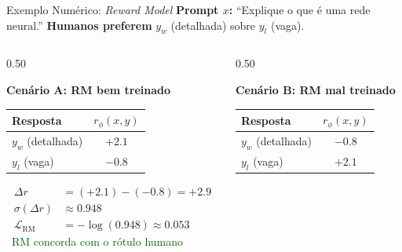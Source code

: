 \documentclass[aspectratio=169, xcolor=dvipsnames]{beamer}
\begin{document}
  \begin{frame}{Exemplo Numérico: \textit{Reward Model}}
    \textbf{Prompt $x$:} ``Explique o que é uma rede neural.'' \quad
    \textbf{Humanos preferem} $y_w$ (detalhada) sobre $y_l$ (vaga).

    \vspace{0.4em}
    \begin{columns}[T]
      \begin{column}{0.50\textwidth}
        \begin{block}{\textbf{Cenário A: RM bem treinado}}
          \small
          \begin{tabular}{lc}
            \toprule
            \textbf{Resposta} & $r_\phi(x,y)$ \\
            \midrule
            $y_w$ (detalhada) & $+2.1$ \\
            $y_l$ (vaga)      & $-0.8$ \\
            \bottomrule
          \end{tabular}

          \vspace{0.3em}
          \begin{align*}
            \Delta r &= (+2.1) - (-0.8) = \mathbf{+2.9} \\[1pt]
            \sigma(\Delta r) &\approx 0.948 \\[1pt]
            \mathcal{L}_{\text{RM}} &= -\log(0.948) \approx \mathbf{0.053}
          \end{align*}
          \centering \textcolor{DarkGreen}{\checkmark\ RM concorda com o rótulo humano}
        \end{block}
      \end{column}
      \begin{column}{0.50\textwidth}
        \begin{block}{\textbf{Cenário B: RM mal treinado}}
          \small
          \begin{tabular}{lc}
            \toprule
            \textbf{Resposta} & $r_\phi(x,y)$ \\
            \midrule
            $y_w$ (detalhada) & $-0.8$ \\
            $y_l$ (vaga)      & $+2.1$ \\
            \bottomrule
          \end{tabular}


\end{block}
\end{column}
\end{columns}
\end{frame}
\end{document}
